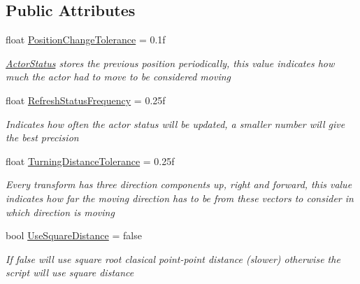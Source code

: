 \subsection*{Public Attributes}
\begin{DoxyCompactItemize}
\item 
float \hyperlink{class_g_t_core_1_1_general_1_1_actor_status_a0a365c9c2ca1a5b136caac5d2ffd68a9}{Position\+Change\+Tolerance} = 0.\+1f
\begin{DoxyCompactList}\small\item\em \hyperlink{class_g_t_core_1_1_general_1_1_actor_status}{Actor\+Status} stores the previous position periodically, this value indicates how much the actor had to move to be considered \textquotesingle{}moving\textquotesingle{} \end{DoxyCompactList}\item 
float \hyperlink{class_g_t_core_1_1_general_1_1_actor_status_a09cf9b4d30d9694ac391b5cb692ec1da}{Refresh\+Status\+Frequency} = 0.\+25f
\begin{DoxyCompactList}\small\item\em Indicates how often the actor status will be updated, a smaller number will give the best precision \end{DoxyCompactList}\item 
float \hyperlink{class_g_t_core_1_1_general_1_1_actor_status_a38ef3887ee64950042929e342f00d015}{Turning\+Distance\+Tolerance} = 0.\+25f
\begin{DoxyCompactList}\small\item\em Every transform has three direction components up, right and forward, this value indicates how far the moving direction has to be from these vectors to consider in which direction is moving \end{DoxyCompactList}\item 
bool \hyperlink{class_g_t_core_1_1_general_1_1_actor_status_a0d0cbeef5571a70649af514bf4278069}{Use\+Square\+Distance} = false
\begin{DoxyCompactList}\small\item\em If false will use square root clasical point-\/point distance (slower) otherwise the script will use square distance \end{DoxyCompactList}\end{DoxyCompactItemize}
